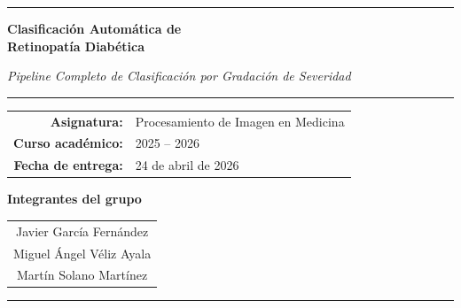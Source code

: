 \documentclass[12pt, a4paper]{article}
\begin{document}

\begin{titlepage}
  \centering

  \begin{minipage}{\textwidth}
    \color{azuloscuro}\rule{\textwidth}{4pt}
  \end{minipage}

  \vspace{2.5cm}

  {\Huge\bfseries
    Clasificación Automática de\\[6pt]
    Retinopatía Diabética
  }

  \vspace{0.5cm}
  {\large\itshape
    Pipeline Completo de Clasificación por Gradación de Severidad
  }

  \vspace{0.4cm}
  \color{azulmedio}\rule{0.6\textwidth}{1.5pt}\color{black}

  \vspace{2cm}

  \begin{tabular}{rl}
    \textbf{Asignatura:}       & Procesamiento de Imagen en Medicina \\[4pt]
    \textbf{Curso académico:}  & 2025 -- 2026 \\[4pt]
    \textbf{Fecha de entrega:} & 24 de abril de 2026 \\
  \end{tabular}

  \vspace{2cm}

  {\large\bfseries Integrantes del grupo}\\[0.6cm]
  \begin{tabular}{c}
    Javier García Fernández    \\[4pt]
    Miguel Ángel Véliz Ayala  \\[4pt]
    Martín Solano Martínez     \\
  \end{tabular}

  \vfill

  \begin{minipage}{\textwidth}
    \color{azuloscuro}\rule{\textwidth}{4pt}
  \end{minipage}

\end{titlepage}
\end{document}
